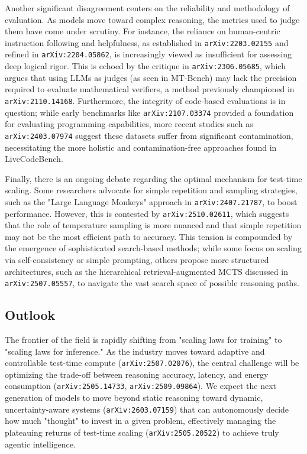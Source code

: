 \documentclass[11pt]{article}
\begin{document}
Another significant disagreement centers on the reliability and methodology of evaluation. As models move toward complex reasoning, the metrics used to judge them have come under scrutiny. For instance, the reliance on human-centric instruction following and helpfulness, as established in \texttt{arXiv:2203.02155} and refined in \texttt{arXiv:2204.05862}, is increasingly viewed as insufficient for assessing deep logical rigor. This is echoed by the critique in \texttt{arXiv:2306.05685}, which argues that using LLMs as judges (as seen in MT-Bench) may lack the precision required to evaluate mathematical verifiers, a method previously championed in \texttt{arXiv:2110.14168}. Furthermore, the integrity of code-based evaluations is in question; while early benchmarks like \texttt{arXiv:2107.03374} provided a foundation for evaluating programming capabilities, more recent studies such as \texttt{arXiv:2403.07974} suggest these datasets suffer from significant contamination, necessitating the more holistic and contamination-free approaches found in LiveCodeBench.

Finally, there is an ongoing debate regarding the optimal mechanism for test-time scaling. Some researchers advocate for simple repetition and sampling strategies, such as the "Large Language Monkeys" approach in \texttt{arXiv:2407.21787}, to boost performance. However, this is contested by \texttt{arXiv:2510.02611}, which suggests that the role of temperature sampling is more nuanced and that simple repetition may not be the most efficient path to accuracy. This tension is compounded by the emergence of sophisticated search-based methods; while some focus on scaling via self-consistency or simple prompting, others propose more structured architectures, such as the hierarchical retrieval-augmented MCTS discussed in \texttt{arXiv:2507.05557}, to navigate the vast search space of possible reasoning paths.

\subsection{Outlook}

The frontier of the field is rapidly shifting from "scaling laws for training" to "scaling laws for inference." As the industry moves toward adaptive and controllable test-time compute (\texttt{arXiv:2507.02076}), the central challenge will be optimizing the trade-off between reasoning accuracy, latency, and energy consumption (\texttt{arXiv:2505.14733}, \texttt{arXiv:2509.09864}). We expect the next generation of models to move beyond static reasoning toward dynamic, uncertainty-aware systems (\texttt{arXiv:2603.07159}) that can autonomously decide how much "thought" to invest in a given problem, effectively managing the plateauing returns of test-time scaling (\texttt{arXiv:2505.20522}) to achieve truly agentic intelligence.
\end{document}
